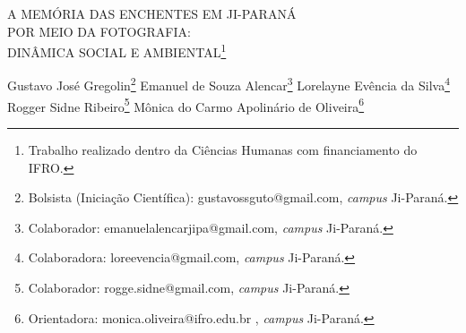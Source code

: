 \documentclass[article,12pt,onesidea,4paper,english,brazil]{abntex2}
\begin{document}
	
	
	\frenchspacing 
	
	\begin{center}
		\LARGE A MEMÓRIA DAS ENCHENTES EM JI-PARANÁ\\POR MEIO DA FOTOGRAFIA:\\ DINÂMICA SOCIAL E AMBIENTAL\footnote{Trabalho realizado dentro da Ciências Humanas com financiamento do IFRO.}
		
		\normalsize
		Gustavo José Gregolin\footnote{Bolsista (Iniciação Científica): gustavossguto@gmail.com, \textit{campus} Ji-Paraná.} 
		Emanuel de Souza Alencar\footnote{Colaborador: emanuelalencarjipa@gmail.com, \textit{campus} Ji-Paraná.} 
		Lorelayne Evência da Silva\footnote{Colaboradora: loreevencia@gmail.com, \textit{campus} Ji-Paraná.} \\
		Rogger Sidne Ribeiro\footnote{Colaborador: rogge.sidne@gmail.com, \textit{campus} Ji-Paraná.}
		Mônica do Carmo Apolinário de Oliveira\footnote{Orientadora: monica.oliveira@ifro.edu.br , \textit{campus} Ji-Paraná.} 
	\end{center}
	
\end{document}
